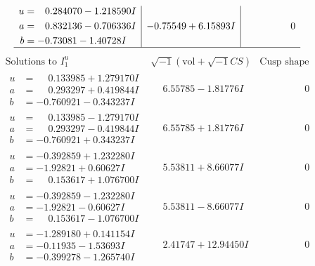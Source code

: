 \documentclass[1p]{elsarticle_modified}
\theoremstyle{definition}
\newcommand{\I}{\sqrt{-1}}
\begin{document}
$$\begin{array}{c|c|c}
\begin{aligned}
u &= \phantom{-}0.284070 - 1.218590 I \\
a &= \phantom{-}0.832136 - 0.706336 I \\
b &= -0.73081 - 1.40728 I\end{aligned}
 & -0.75549 + 6.15893 I & \phantom{-0.000000 } 0\\
 \hline 
 \end{array}$$\newpage$$\begin{array}{c|c|c}  
\text{Solutions to }I^u_{1}& \I (\text{vol} + \sqrt{-1}CS) & \text{Cusp shape}\\
 \hline 
\begin{aligned}
u &= \phantom{-}0.133985 + 1.279170 I \\
a &= \phantom{-}0.293297 + 0.419844 I \\
b &= -0.760921 - 0.343237 I\end{aligned}
 & \phantom{-}6.55785 - 1.81776 I & \phantom{-0.000000 } 0 \\ \hline\begin{aligned}
u &= \phantom{-}0.133985 - 1.279170 I \\
a &= \phantom{-}0.293297 - 0.419844 I \\
b &= -0.760921 + 0.343237 I\end{aligned}
 & \phantom{-}6.55785 + 1.81776 I & \phantom{-0.000000 } 0 \\ \hline\begin{aligned}
u &= -0.392859 + 1.232280 I \\
a &= -1.92821 + 0.60627 I \\
b &= \phantom{-}0.153617 + 1.076700 I\end{aligned}
 & \phantom{-}5.53811 + 8.66077 I & \phantom{-0.000000 } 0 \\ \hline\begin{aligned}
u &= -0.392859 - 1.232280 I \\
a &= -1.92821 - 0.60627 I \\
b &= \phantom{-}0.153617 - 1.076700 I\end{aligned}
 & \phantom{-}5.53811 - 8.66077 I & \phantom{-0.000000 } 0 \\ \hline\begin{aligned}
u &= -1.289180 + 0.141154 I \\
a &= -0.11935 - 1.53693 I \\
b &= -0.399278 - 1.265740 I\end{aligned}
 & \phantom{-}2.41747 + 12.94450 I & \phantom{-0.000000 } 0 \\ \hline\begin{aligned}

\end{aligned}
\end{array}$$
\end{document}

